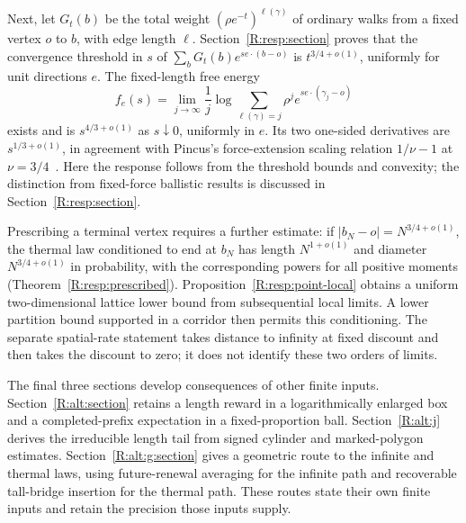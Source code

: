 Next, let $G_t(b)$ be the total weight $(\rho e^{-t})^{\ell(\gamma)}$ of ordinary walks from a fixed vertex $o$ to $b$, with edge length $\ell$. Section~\ref{R:resp:section} proves that the convergence threshold in $s$ of
$\sum_bG_t(b)e^{s e\cdot(b-o)}$ is $t^{3/4+o(1)}$, uniformly for unit directions $e$. The fixed-length free energy
\[
 f_e(s)=\lim_{j\to\infty}\frac1j\log\sum_{\ell(\gamma)=j}\rho^j e^{s e\cdot(\gamma_j-o)}
\]
exists and is $s^{4/3+o(1)}$ as $s\downarrow0$, uniformly in $e$. Its two one-sided derivatives are $s^{1/3+o(1)}$, in agreement with Pincus's force-extension scaling relation $1/\nu-1$ at $\nu=3/4$~\cite[Eq.~(I.4)]{Pincus1976}. Here the response follows from the threshold bounds and convexity; the distinction from fixed-force ballistic results is discussed in Section~\ref{R:resp:section}.

Prescribing a terminal vertex requires a further estimate: if $|b_N-o|=N^{3/4+o(1)}$, the thermal law conditioned to end at $b_N$ has length $N^{1+o(1)}$ and diameter $N^{3/4+o(1)}$ in probability, with the corresponding powers for all positive moments (Theorem~\ref{R:resp:prescribed}). Proposition~\ref{R:resp:point-local} obtains a uniform two-dimensional lattice lower bound from subsequential local limits. A lower partition bound supported in a corridor then permits this conditioning. The separate spatial-rate statement takes distance to infinity at fixed discount and then takes the discount to zero; it does not identify these two orders of limits.

The final three sections develop consequences of other finite inputs. Section~\ref{R:alt:section} retains a length reward in a logarithmically enlarged box and a completed-prefix expectation in a fixed-proportion ball. Section~\ref{R:alt:j} derives the irreducible length tail from signed cylinder and marked-polygon estimates. Section~\ref{R:alt:g:section} gives a geometric route to the infinite and thermal laws, using future-renewal averaging for the infinite path and recoverable tall-bridge insertion for the thermal path. These routes state their own finite inputs and retain the precision those inputs supply.

